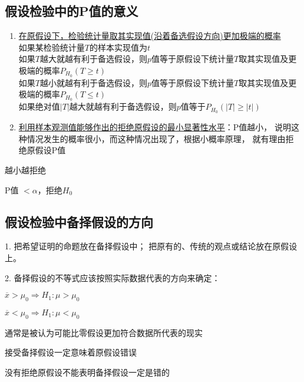 \documentclass[UTF8,10pt]{book}
\begin{document}
        \subsection{假设检验中的P值的意义}
        {\kaishu
        	
        	\begin{enumerate}
        		\item \underline{在原假设下，检验统计量取其实现值(沿着备选假设方向)更加极端的概率} \\
        			如果某检验统计量$T$的样本实现值为$t$ \\        			
        			如果$T$越大就越有利于备选假设，则$p$值等于原假设下统计量$T$取其实现值及更极端的概率$P_{H_0}(T\ge t)$ \\
        			如果$T$越小就越有利于备选假设，则$p$值等于原假设下统计量$T$取其实现值及更极端的概率$P_{H_0}(T\le t)$ \\
        			如果绝对值$|T|$越大就越有利于备选假设，则$p$值等于$P_{H_0}(|T|\ge |t|)$ \\
        			
        		\item \underline{利用样本观测值能够作出的拒绝原假设的最小显著性水平}：P值越小，
        		说明这种情况发生的概率很小，而这种情况出现了，根据小概率原理，
        		就有理由拒绝原假设P值
        		
        		
        		
        		
        	\end{enumerate}
        
        
        越小越拒绝
        
        P值  $<\alpha$，拒绝$H_0$
        \subsection{假设检验中备择假设的方向}
        1. 把希望证明的命题放在备择假设中； 
        把原有的、传统的观点或结论放在原假设上。 
        
        2. 备择假设的不等式应该按照实际数据代表的方向来确定： 
        
        $ \overline{x} > \mu_0 \Rightarrow H_1:\mu>\mu_0 $ 
        
        $ \overline{x} < \mu_0 \Rightarrow H_1:\mu<\mu_0 $ 
        
        通常是被认为可能比零假设更加符合数据所代表的现实

        {\kaishu 接受备择假设一定意味着原假设错误	
        
        没有拒绝原假设不能表明备择假设一定是错的}
}
\end{document}
